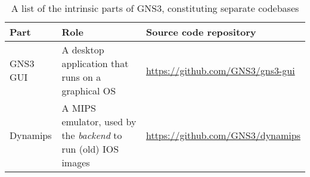 \begin{table}
  \centering
  \begin{tabulary}{0.9\textwidth}{lLL}
    \toprule
      \textbf{Part}  & \textbf{Role}                                                       & \textbf{Source code repository}\\
    \midrule
      GNS3 GUI       & A desktop application that runs on a graphical OS                   & \url{https://github.com/GNS3/gns3-gui}\\
      Dynamips       & A MIPS emulator, used by the \emph{backend} to run (old) IOS images & \url{https://github.com/GNS3/dynamips}\\
    \bottomrule
  \end{tabulary}
  \caption{%
    A list of the intrinsic parts of GNS3, constituting separate codebases
  }
  \label{tab:gns3components}
\end{table}
